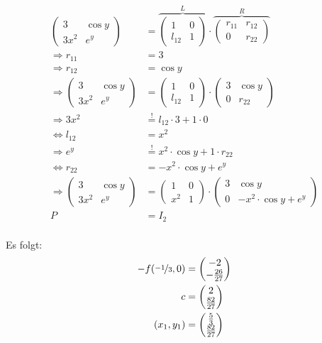 \begin{align}
	\begin{pmatrix}
		3     & \cos y\\
		3 x^2 & e^y
	\end{pmatrix}
	&=
	\overbrace{\begin{pmatrix}
		1      & 0\\
		l_{12} & 1
	\end{pmatrix}}^L \cdot 
	\overbrace{\begin{pmatrix}
		r_{11} & r_{12}\\
		0      & r_{22}
	\end{pmatrix}}^R\\
	\Rightarrow r_{11} &= 3\\
	\Rightarrow r_{12} &= \cos y\\
	\Rightarrow \begin{pmatrix}
		3     & \cos y\\
		3 x^2 & e^y
	\end{pmatrix}
	&=
	\begin{pmatrix}
		1      & 0\\
		l_{12} & 1
	\end{pmatrix} \cdot 
	\begin{pmatrix}
		3 & \cos y\\
		0 & r_{22}
	\end{pmatrix}\\
	\Rightarrow 3x^2 &\stackrel{!}{=} l_{12} \cdot 3 + 1 \cdot 0\\
	\Leftrightarrow l_{12} &= x^2\\
	\Rightarrow e^y &\stackrel{!}{=} x^2 \cdot \cos y + 1 \cdot r_{22}\\
	\Leftrightarrow r_{22} &= -x^2 \cdot \cos y + e^y\\
	\Rightarrow \begin{pmatrix}
		3     & \cos y\\
		3 x^2 & e^y
	\end{pmatrix}
	&=
	\begin{pmatrix}
		1   & 0\\
		x^2 & 1
	\end{pmatrix} \cdot 
	\begin{pmatrix}
		3 & \cos y\\
		0 & -x^2 \cdot \cos y + e^y
	\end{pmatrix}\\
	P &= I_2\\
\end{align}

Es folgt:
\begin{align}
-f ( \nicefrac{-1}{3}, 0) &= \begin{pmatrix} -2\\ -\frac{26}{27}\end{pmatrix}\\
c &= \begin{pmatrix} 2\\ \frac{82}{27} \end{pmatrix}\\ %
(x_1, y_1) &= \begin{pmatrix} \frac{5}{3}\\ \frac{82}{27}\end{pmatrix}
\end{align}
